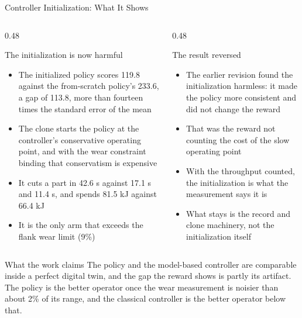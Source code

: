 \documentclass[11pt,aspectratio=169]{beamer}
\begin{document}
\begin{frame}{Controller Initialization: What It Shows}
    \small
    \begin{columns}[T]
        \begin{column}{0.48\textwidth}
            \begin{alertblock}{The initialization is now harmful}
            \scriptsize
            \begin{itemize}
                \item The initialized policy scores \alert{119.8} against the from-scratch policy's 233.6, a gap of 113.8, more than fourteen times the standard error of the mean
                \item The clone starts the policy at the controller's conservative operating point, and with the wear constraint binding that conservatism is expensive
                \item It cuts a part in \alert{42.6 s} against 17.1 s and 11.4 s, and spends 81.5 kJ against 66.4 kJ
                \item It is the only arm that exceeds the flank wear limit (9\%)
            \end{itemize}
            \end{alertblock}
        \end{column}
        \begin{column}{0.48\textwidth}
            \begin{block}{The result reversed}
            \scriptsize
            \begin{itemize}
                \item The earlier revision found the initialization harmless: it made the policy more consistent and did not change the reward
                \item That was the reward not counting the cost of the slow operating point
                \item With the throughput counted, the initialization is what the measurement says it is
                \item \alert{What stays} is the record and clone machinery, not the initialization itself
            \end{itemize}
            \end{block}
        \end{column}
    \end{columns}

    \vspace{0.1em}
    \begin{alertblock}{What the work claims}
    \scriptsize
    The policy and the model-based controller are comparable inside a perfect digital twin, and the gap
    the reward shows is partly its artifact. The policy is the better operator once the wear
    measurement is noisier than about 2\% of its range, and the classical controller is the better
    operator below that.
    \end{alertblock}
\end{frame}
\end{document}
